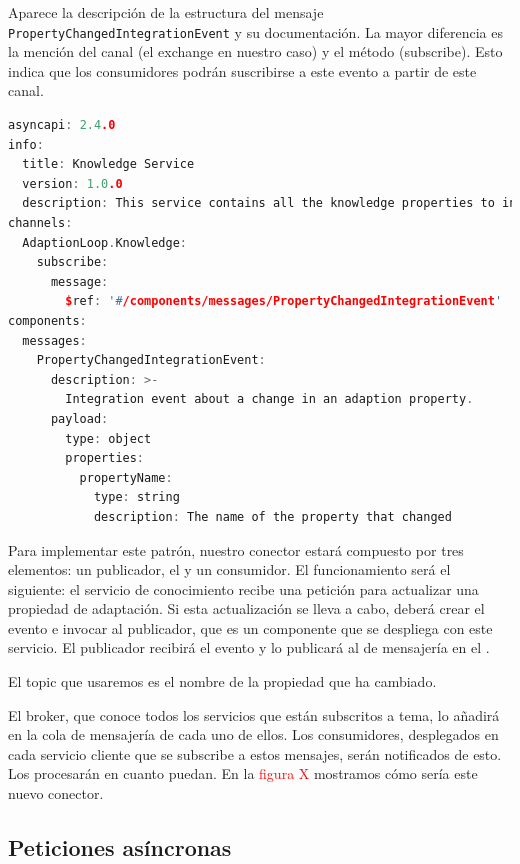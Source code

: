 Aparece la descripción de la estructura del mensaje \texttt{PropertyChangedIntegrationEvent} y su documentación. La mayor diferencia es la mención del canal (el exchange en nuestro caso) y el método (subscribe). Esto indica que los consumidores podrán suscribirse a este evento a partir de este canal.

\begin{lstlisting}[language={C++},caption={Ejemplo del evento de integración \emph{builder}.},captionpos=b, label=ls:asyncapi-propertychanged-integrationevent]
asyncapi: 2.4.0
info:
  title: Knowledge Service
  version: 1.0.0
  description: This service contains all the knowledge properties to inform the rest of the loop.
channels:
  AdaptionLoop.Knowledge:
    subscribe:
      message:
        $ref: '#/components/messages/PropertyChangedIntegrationEvent'
components:
  messages:
    PropertyChangedIntegrationEvent:
      description: >-
        Integration event about a change in an adaption property.
      payload:
        type: object
        properties:
          propertyName:
            type: string
            description: The name of the property that changed
\end{lstlisting}

Para implementar este patrón, nuestro conector estará compuesto por tres elementos: un publicador, el  y un consumidor. El funcionamiento será el siguiente: el servicio de conocimiento recibe una petición para actualizar una propiedad de adaptación. Si esta actualización se lleva a cabo, deberá crear el evento e invocar al publicador, que es un componente que se despliega con este servicio. El publicador recibirá el evento y lo publicará al  de mensajería en el .

El topic que usaremos es el nombre de la propiedad que ha cambiado.

El broker, que conoce todos los servicios que están subscritos a tema, lo añadirá en la cola de mensajería de cada uno de ellos. Los consumidores, desplegados en cada servicio cliente que se subscribe a estos mensajes, serán notificados de esto. Los procesarán en cuanto puedan. En la \textcolor{red}{figura X} mostramos cómo sería este nuevo conector.

\subsection{Peticiones asíncronas}

